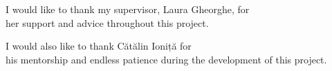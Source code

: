 \vspace*{7cm}
\begin{center}
I would like to thank my supervisor, Laura Gheorghe, for\\
her support and advice throughout this project.
\end{center}
\vspace{0.6cm}
\begin{center}
I would also like to thank Cătălin Ioniță for\\
his mentorship and endless patience during the development of this project.
\end{center}
